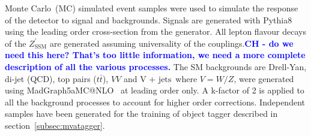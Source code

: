 \documentclass[a4paper,11pt]{article}
\makeatletter
\newcommand{\CH}[1] {\textbf{\textcolor{blue}{CH - #1}}}
\newcommand{\ZpSSM}{\ensuremath{Z^{\prime}_{\mathrm{SSM}}}}
\newcommand*{\vj}{\ensuremath{\text{V + jets}}}
\newcommand*{\ttbar}{\ensuremath{t\bar{t}}}
\newcommand{\amc}{{\sc MadGraph5\textunderscore}a{\sc MC@NLO}}
\newcommand{\py}{{\sc Pythia8}}
\makeatother
\begin{document}
Monte Carlo~(MC) simulated event samples were used to simulate the response of the detector to signal and backgrounds. Signals are generated with \py~\cite{Sjostrand:2014zea} using the leading order cross-section from the generator.
All lepton flavour decays of the $\ZpSSM$ are generated assuming universality of the couplings.\CH{do we need this here? That's too little information, we need a more complete description of all the various processes.}
The SM backgrounds are Drell-Yan, di-jet (QCD), top pairs (\ttbar), $VV$ and \vj\ where $V=W/Z$,  were generated using \amc~\cite{Alwall:2014hca} at leading order only. A k-factor of 2 is applied to all the background processes to account for higher order corrections.
Independent samples have been generated for the training of object tagger described in section~\ref{subsec:mvatagger}.


\end{document}
